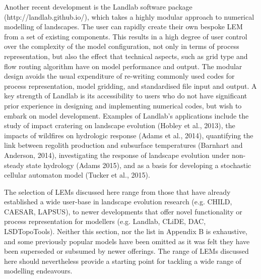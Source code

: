 Another recent development is the Landlab software package (http://landlab.github.io/), which takes a highly modular approach to numerical modelling of landscapes. The user can rapidly create their own bespoke LEM from a set of existing components. This results in a high degree of user control over the complexity of the model configuration, not only in terms of process representation, but also the effect that technical aspects, such as grid type and flow routing algorithm have on model performance and output. The modular design avoids the usual expenditure of re-writing commonly used codes for process representation, model gridding, and standardised file input and output. A key strength of Landlab is its accessibility to users who do not have significant prior experience in designing and implementing numerical codes, but wish to embark on model development. Examples of Landlab’s applications include the study of impact cratering on landscape evolution (Hobley et al., 2013), the impacts of wildfires on hydrologic response (Adams et al., 2014), quantifying the link between regolith production and subsurface temperatures (Barnhart and Anderson, 2014), investigating the response of landscape evolution under non-steady state hydrology (Adams 2015), and as a basis for developing a stochastic cellular automaton model (Tucker et al., 2015).

The selection of LEMs discussed here range from those that have already established a wide user-base in landscape evolution research (e.g. CHILD, CAESAR, LAPSUS), to newer developments that offer novel functionality or process representation for modellers (e.g. Landlab, CLiDE, DAC, LSDTopoTools). Neither this section, nor the list in Appendix B is exhaustive, and some previously popular models have been omitted as it was felt they have been superseded or subsumed by newer offerings. The range of LEMs discussed here should nevertheless provide a starting point for tackling a wide range of modelling endeavours.

